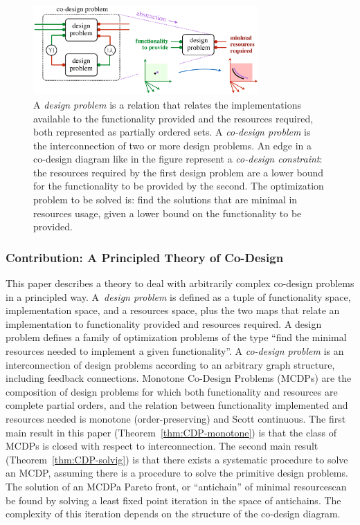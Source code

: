 \documentclass[twocolumn,english]{IEEEtran}
\theoremstyle{definition}
\theoremstyle{plain}
\theoremstyle{definition}
\theoremstyle{remark}
\theoremstyle{definition}
\theoremstyle{plain}
\theoremstyle{plain}
\newcommand{\colR}{\color[rgb]{0.555789,0.000000,0.000000}}
\newcommand{\colF}{\color[rgb]{0.094869,0.500000,0.000000}}
\newcommand{\R}[1]{{\colR #1}}
\newcommand{\F}[1]{{\colF #1}}
\newcommand{\scottcontinuous}{Scott continuous\xspace}
\begin{document}
\begin{figure}[t]
\begin{centering}
\includegraphics[width=8.6cm]{gmcdptro_intro}
\par\end{centering}
\caption{\label{fig:intro}A \emph{design problem }is a relation that relates
the implementations available to the \F{functionality provided}
 and the \R{resources required}, both represented as partially ordered
sets. A\emph{ co-design problem }is the interconnection of two or
more design problems. An edge in a co-design diagram like in the figure
represent a \emph{co-design constraint}: the resources required by
the first design problem are a lower bound for the functionality to
be provided by the second. The optimization problem to be solved is:
find the solutions that are minimal in resources usage, given a lower
bound on the functionality to be provided. }
\end{figure}


\subsubsection*{Contribution: A Principled Theory of Co-Design}

This paper describes a theory to deal with arbitrarily complex co-design
problems in a principled way. A~\emph{design problem} is defined
as a tuple of functionality space, implementation space, and a resources
space, plus the two maps that relate an implementation to functionality
provided and resources required. A design problem defines a family
of optimization problems of the type ``find the minimal resources
needed to implement a given functionality''. A \emph{co-design problem}
is an interconnection of design problems according to an arbitrary
graph structure, including feedback connections. Monotone Co-Design
Problems (MCDPs) are the composition of design problems for which
both functionality and resources are complete partial orders, and
the relation between functionality implemented and resources needed
is monotone (order-preserving) and \scottcontinuous. The first main
result in this paper (Theorem~\vref{thm:CDP-monotone}) is that the
class of MCDPs is closed with respect to interconnection. The second
main result (Theorem~\vref{thm:CDP-solvig}) is that there exists
a systematic procedure to solve an MCDP, assuming there is a procedure
to solve the primitive design problems. The solution of an MCDP\textemdash a
Pareto front, or ``antichain'' of minimal resources\textemdash can
be found by solving a least fixed point iteration in the space of
antichains. The complexity of this iteration depends on the structure
of the co-design diagram.
\end{document}
